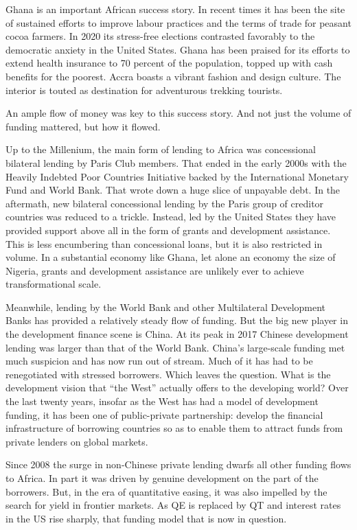 \documentclass[
]{book}
\begin{document}
Ghana is an important African success story. In recent times it has been the site of sustained efforts to improve labour practices and the terms of trade for peasant cocoa farmers. In 2020 its stress-free elections contrasted favorably to the democratic anxiety in the United States. Ghana has been praised for its efforts to extend health insurance to 70 percent of the population, topped up with cash benefits for the poorest. Accra boasts a vibrant fashion and design culture. The interior is touted as destination for adventurous trekking tourists.

An ample flow of money was key to this success story. And not just the volume of funding mattered, but how it flowed.

Up to the Millenium, the main form of lending to Africa was concessional bilateral lending by Paris Club members. That ended in the early 2000s with the Heavily Indebted Poor Countries Initiative backed by the International Monetary Fund and World Bank. That wrote down a huge slice of unpayable debt. In the aftermath, new bilateral concessional lending by the Paris group of creditor countries was reduced to a trickle. Instead, led by the United States they have provided support above all in the form of grants and development assistance. This is less encumbering than concessional loans, but it is also restricted in volume. In a substantial economy like Ghana, let alone an economy the size of Nigeria, grants and development assistance are unlikely ever to achieve transformational scale.

Meanwhile, lending by the World Bank and other Multilateral Development Banks has provided a relatively steady flow of funding. But the big new player in the development finance scene is China. At its peak in 2017 Chinese development lending was larger than that of the World Bank. China's large-scale funding met much suspicion and has now run out of stream. Much of it has had to be renegotiated with stressed borrowers. Which leaves the question. What is the development vision that ``the West'' actually offers to the developing world? Over the last twenty years, insofar as the West has had a model of development funding, it has been one of public-private partnership: develop the financial infrastructure of borrowing countries so as to enable them to attract funds from private lenders on global markets.

Since 2008 the surge in non-Chinese private lending dwarfs all other funding flows to Africa. In part it was driven by genuine development on the part of the borrowers. But, in the era of quantitative easing, it was also impelled by the search for yield in frontier markets. As QE is replaced by QT and interest rates in the US rise sharply, that funding model that is now in question.
\end{document}
